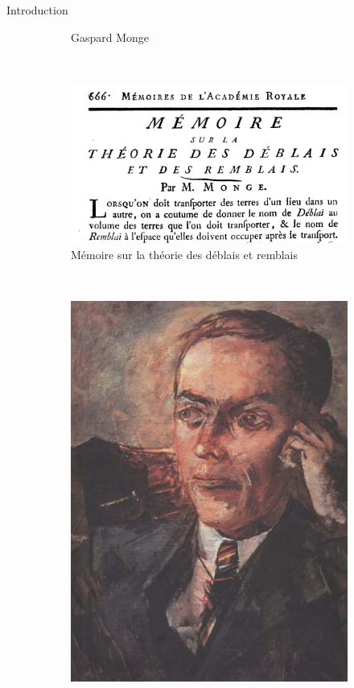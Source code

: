 \documentclass{beamer}
\begin{document}
\begin{frame}{Introduction}
{\begin{figure}
\begin{subfigure}[c]{0.3\linewidth}
    		\caption{Gaspard Monge}
    	\end{subfigure}
    	~
    	\begin{subfigure}[c]{0.3\linewidth}
    		\includegraphics[width=\linewidth]{img/memoire.jpg}
    		\caption{Mémoire sur la théorie des déblais et remblais}
    	\end{subfigure}
    	~
    	\begin{subfigure}[c]{0.3\linewidth}
    		\includegraphics[width=\linewidth]{img/kantorovitch.jpg}

\end{subfigure}
\end{figure}}
\end{frame}
\end{document}
